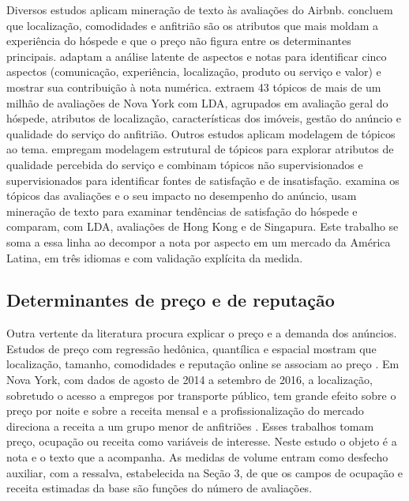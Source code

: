 Diversos estudos aplicam mineração de texto às avaliações do Airbnb. \citet{cheng2019} concluem que localização, comodidades e anfitrião são os atributos que mais moldam a experiência do hóspede e que o preço não figura entre os determinantes principais. \citet{luo2019} adaptam a análise latente de aspectos e notas para identificar cinco aspectos (comunicação, experiência, localização, produto ou serviço e valor) e mostrar sua contribuição à nota numérica. \citet{sutherland2020} extraem 43 tópicos de mais de um milhão de avaliações de Nova York com LDA, agrupados em avaliação geral do hóspede, atributos de localização, características dos imóveis, gestão do anúncio e qualidade do serviço do anfitrião. Outros estudos aplicam modelagem de tópicos ao tema. \citet{ding2020} empregam modelagem estrutural de tópicos para explorar atributos de qualidade percebida do serviço e \citet{ding2021} combinam tópicos não supervisionados e supervisionados para identificar fontes de satisfação e de insatisfação. \citet{zhang2019} examina os tópicos das avaliações e o seu impacto no desempenho do anúncio, \citet{cavique2022} usam mineração de texto para examinar tendências de satisfação do hóspede e \citet{kiatkawsin2020} comparam, com LDA, avaliações de Hong Kong e de Singapura. Este trabalho se soma a essa linha ao decompor a nota por aspecto em um mercado da América Latina, em três idiomas e com validação explícita da medida.

\subsection{Determinantes de preço e de reputação}

Outra vertente da literatura procura explicar o preço e a demanda dos anúncios. Estudos de preço com regressão hedônica, quantílica e espacial mostram que localização, tamanho, comodidades e reputação online se associam ao preço \citep{wang2017,chicaolmo2020,gyodi2021}. Em Nova York, com dados de agosto de 2014 a setembro de 2016, a localização, sobretudo o acesso a empregos por transporte público, tem grande efeito sobre o preço por noite e sobre a receita mensal e a profissionalização do mercado direciona a receita a um grupo menor de anfitriões \citep{deboosere2019}. Esses trabalhos tomam preço, ocupação ou receita como variáveis de interesse. Neste estudo o objeto é a nota e o texto que a acompanha. As medidas de volume entram como desfecho auxiliar, com a ressalva, estabelecida na Seção 3, de que os campos de ocupação e receita estimadas da base são funções do número de avaliações.

